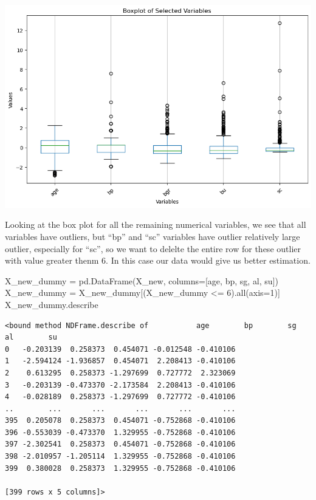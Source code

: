 \documentclass[
  11pt,
  letterpaper,
  DIV=11,
  numbers=noendperiod]{scrartcl}
\newenvironment{Shaded}{\begin{snugshade}}{\end{snugshade}}
\newcommand{\BuiltInTok}[1]{\textcolor[rgb]{0.00,0.23,0.31}{#1}}
\newcommand{\DecValTok}[1]{\textcolor[rgb]{0.68,0.00,0.00}{#1}}
\newcommand{\NormalTok}[1]{\textcolor[rgb]{0.00,0.23,0.31}{#1}}
\newcommand{\OperatorTok}[1]{\textcolor[rgb]{0.37,0.37,0.37}{#1}}
\newcommand{\StringTok}[1]{\textcolor[rgb]{0.13,0.47,0.30}{#1}}
\begin{document}
\includegraphics{assignment6111_files/figure-pdf/cell-23-output-1.png}

Looking at the box plot for all the remaining numerical variables, we
see that all variables have outliers, but ``bp'' and ``sc'' variables
have outlier relatively large outlier, especially for ``sc'', so we want
to delelte the entire row for these outlier with value greater thenm 6.
In this case our data would give us better estimation.

\begin{Shaded}
\begin{Highlighting}[]
\NormalTok{X\_new\_dummy }\OperatorTok{=}\NormalTok{ pd.DataFrame(X\_new, columns}\OperatorTok{=}\NormalTok{[}\StringTok{\textquotesingle{}age\textquotesingle{}}\NormalTok{, }\StringTok{\textquotesingle{}bp\textquotesingle{}}\NormalTok{, }\StringTok{\textquotesingle{}sg\textquotesingle{}}\NormalTok{, }\StringTok{\textquotesingle{}al\textquotesingle{}}\NormalTok{, }\StringTok{\textquotesingle{}su\textquotesingle{}}\NormalTok{]) }
\NormalTok{X\_new\_dummy }\OperatorTok{=}\NormalTok{ X\_new\_dummy[(X\_new\_dummy }\OperatorTok{\textless{}=} \DecValTok{6}\NormalTok{).}\BuiltInTok{all}\NormalTok{(axis}\OperatorTok{=}\DecValTok{1}\NormalTok{)] }
\NormalTok{X\_new\_dummy.describe}
\end{Highlighting}
\end{Shaded}

\begin{verbatim}
<bound method NDFrame.describe of           age        bp        sg        al        su
0   -0.203139  0.258373  0.454071 -0.012548 -0.410106
1   -2.594124 -1.936857  0.454071  2.208413 -0.410106
2    0.613295  0.258373 -1.297699  0.727772  2.323069
3   -0.203139 -0.473370 -2.173584  2.208413 -0.410106
4   -0.028189  0.258373 -1.297699  0.727772 -0.410106
..        ...       ...       ...       ...       ...
395  0.205078  0.258373  0.454071 -0.752868 -0.410106
396 -0.553039 -0.473370  1.329955 -0.752868 -0.410106
397 -2.302541  0.258373  0.454071 -0.752868 -0.410106
398 -2.010957 -1.205114  1.329955 -0.752868 -0.410106
399  0.380028  0.258373  1.329955 -0.752868 -0.410106

[399 rows x 5 columns]>
\end{verbatim}
\end{document}

